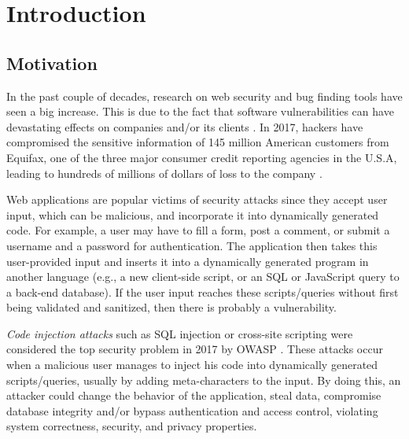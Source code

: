 
\chapter{Introduction}
\label{chapter:introduction}

\section{Motivation}
In the past couple of decades, research on web security and bug finding tools have seen a big increase. This is due to the fact that software vulnerabilities can have devastating effects on companies and/or its clients \cite{telang2007empirical}. In 2017, hackers have compromised the sensitive information of 145 million American customers from Equifax, one of the three major consumer credit reporting agencies in the U.S.A, leading to hundreds of millions of dollars of loss to the company \cite{equifax}.

Web applications are popular victims of security attacks since they accept user input, which can be malicious, and incorporate it into dynamically generated code. 
For example, a user may have to fill a form, post a comment, or submit a username and a password for authentication. 
The application then takes this user-provided input and inserts it into a dynamically generated program in another language (e.g., a new client-side script, or an SQL or JavaScript query to a back-end database). If the user input reaches these scripts/queries without first being validated and sanitized, then there is probably a vulnerability.

\textit{Code injection attacks} such as SQL injection or cross-site scripting were considered the top security problem in 2017 by OWASP \cite{OWASP}. These attacks occur when a malicious user manages to inject his code into dynamically generated scripts/queries, usually by adding meta-characters to the input. By doing this, an attacker could change the behavior of the application, steal data, compromise database integrity and/or bypass authentication and access control, violating system correctness, security, and privacy properties.

